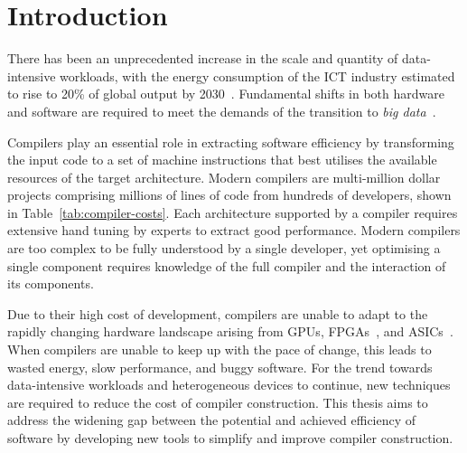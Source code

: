 \chapter{Introduction}

There has been an unprecedented increase in the scale and quantity of data-intensive workloads, with the energy consumption of the ICT industry estimated to rise to 20\% of global output by 2030~\cite{Andrae2019}. Fundamental shifts in both hardware and software are required to meet the demands of the transition to \emph{big data}~\cite{Hashem2015,Gandomi2015}.

Compilers play an essential role in extracting software efficiency by transforming the input code to a set of machine instructions that best utilises the available resources of the target architecture. Modern compilers are multi-million dollar projects comprising millions of lines of code from hundreds of developers, shown in Table~\ref{tab:compiler-costs}. Each architecture supported by a compiler requires extensive hand tuning by experts to extract good performance. Modern compilers are too complex to be fully understood by a single developer, yet optimising a single component requires knowledge of the full compiler and the interaction of its components.%

\begin{table}
  \centering
  
  \caption[Development history and costs of popular open-source compilers]{%
    Development history, logical lines of code (LOC), and estimated cost of 10 popular open-source compiler projects. Estimated costs are calculated using a COCOMO model~\cite{David2001} with average 2019 US software developer salaries~\cite{Glassdoor2019}.%
  }
  \label{tab:compiler-costs}
\end{table}

Due to their high cost of development, compilers are unable to adapt to the rapidly changing hardware landscape arising from GPUs, FPGAs~\cite{Misra2010,Cong2016a}, and \linebreak ASICs~\cite{Misra2010,Jouppi2017}. When compilers are unable to keep up with the pace of change, this leads to wasted energy, slow performance, and buggy software. For the trend towards data-intensive workloads and heterogeneous devices to continue, new techniques are required to reduce the cost of compiler construction. This thesis aims to address the widening gap between the potential and achieved efficiency of software by developing new tools to simplify and improve compiler construction.

